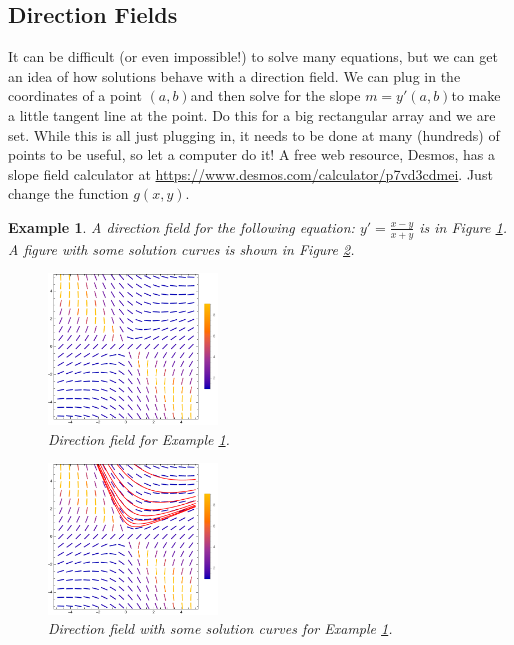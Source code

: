 \documentclass[letterpaper, 11pt, openany]{book}
\theoremstyle{mytheoremstyle}
\theoremstyle{myexamplestyle}
\newtheorem{example}{Example}[section]
\begin{document}
\subsection{Direction Fields}
It can be difficult (or even impossible!) to solve many equations, but we can get an idea of how solutions behave with a direction field.
We can plug in the coordinates of a point \((a,b)\)and then solve for the slope \(m=y'(a,b)\)to make a little tangent line at the point. Do this for a big rectangular array and we are set. While this is all just plugging in, it needs to be done at many (hundreds) of points to be useful, so let a computer do it! A free web resource, Desmos, has a slope field calculator at \url{https://www.desmos.com/calculator/p7vd3cdmei}. Just change the function \(g(x,y)\).

\begin{example}\label{e:de-direction-field}
    A direction field for the following equation: \(y' = \frac{x-y}{x+y}\) is in Figure \ref{f:de-direction-field}. A figure with some solution curves is shown in Figure \ref{f:de-direction-field-with-sols}.

    \begin{figure}[htbp]
        \centering
        \includegraphics[width=0.4\textwidth]{Figures/de-direction-field.pdf}
        \caption{Direction field for Example \ref{e:de-direction-field}.}
        \label{f:de-direction-field}
    \end{figure}

    \begin{figure}[htbp]
        \centering
        \includegraphics[width=0.4\textwidth]{Figures/de-dfield-with-sols.pdf}
        \caption{Direction field with some solution curves for Example \ref{e:de-direction-field}.}
        \label{f:de-direction-field-with-sols}
    \end{figure}
\end{example}
\end{document}
